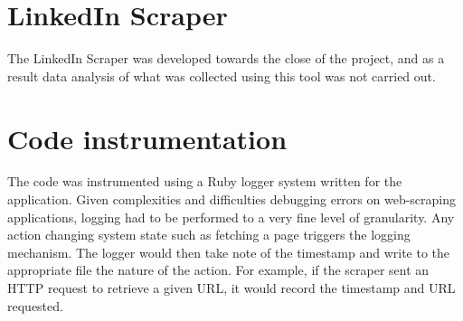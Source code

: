 




\section{LinkedIn Scraper}

The LinkedIn Scraper was developed towards the close of the project, and as a result data analysis of what was collected using this tool was not carried out. %


\section{Code instrumentation}

The code was instrumented using a Ruby logger system written for the application. Given complexities and difficulties debugging errors on web-scraping applications, logging had to be performed to a very fine level of granularity. Any action changing system state such as fetching a page triggers the logging mechanism. The logger would then take note of the timestamp and write to the appropriate file the nature of the action. For example, if the scraper sent an HTTP request to retrieve a given URL, it would record the timestamp and URL requested. 


